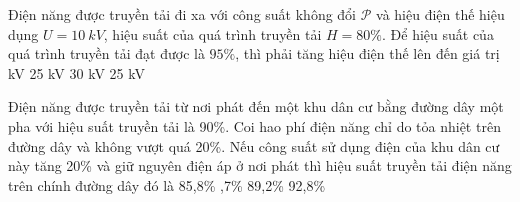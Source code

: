 \begin{vidu}%
	Điện năng được truyền tải đi xa với công suất không đổi $\mathcal{P}$ và hiệu điện thế hiệu dụng $U = 10\ kV$, hiệu suất của quá trình truyền tải $H = 80\%$. Để hiệu suất của quá trình truyền tải đạt được là $95\%$, thì phải tăng hiệu điện thế lên đến giá trị
	\choice
	{ kV}
	{25 kV}
	{30 kV}
	{25 kV}
\end{vidu}
\begin{vidu}%
	Điện năng được truyền tải từ nơi phát đến một khu dân cư bằng đường dây một pha với hiệu suất truyền tải là 90\%. Coi hao phí điện năng chỉ do tỏa nhiệt trên đường dây và không vượt quá 20\%. Nếu công suất sử dụng điện của khu dân cư này tăng 20\% và giữ nguyên điện áp ở nơi phát thì hiệu suất truyền tải điện năng trên chính đường dây đó là
	\choice
	{85,8\%}
	{,7\%}
	{89,2\%}
	{92,8\%}
\end{vidu}
